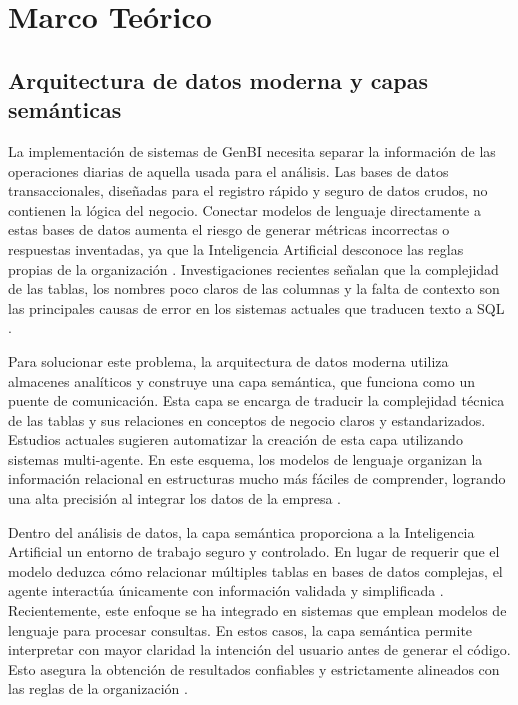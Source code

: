 \section{Marco Teórico}

\subsection{Arquitectura de datos moderna y capas semánticas}

La implementación de sistemas de GenBI
necesita separar la información de las operaciones diarias de aquella usada
para el análisis. Las bases de datos transaccionales, diseñadas para el
registro rápido y seguro de datos crudos, no contienen la lógica del negocio.
Conectar modelos de lenguaje directamente a estas bases de datos aumenta el
riesgo de generar métricas incorrectas o respuestas inventadas, ya que la
Inteligencia Artificial desconoce las reglas propias de la organización
\citep{negash2004fundamentos}. Investigaciones recientes señalan que la
complejidad de las tablas, los nombres poco claros de las columnas y la falta
de contexto son las principales causas de error en los sistemas actuales que
traducen texto a SQL \citep{rissaki2024agentic}.

Para solucionar este problema, la arquitectura de datos moderna utiliza
almacenes analíticos y construye una capa semántica, que funciona como un
puente de comunicación. Esta capa se encarga de traducir la complejidad
técnica de las tablas y sus relaciones en conceptos de negocio claros y
estandarizados. Estudios actuales sugieren automatizar la creación de esta
capa utilizando sistemas multi-agente. En este esquema, los modelos de
lenguaje organizan la información relacional en estructuras mucho más
fáciles de comprender, logrando una alta precisión al integrar los datos
de la empresa \citep{guerbas2025multiagent}.

Dentro del análisis de datos, la capa semántica proporciona a la Inteligencia
Artificial un entorno de trabajo seguro y controlado. En lugar de requerir que
el modelo deduzca cómo relacionar múltiples tablas en bases de datos complejas,
el agente interactúa únicamente con información validada y simplificada
\citep{rissaki2024agentic}. Recientemente, este enfoque se ha integrado en
sistemas que emplean modelos de lenguaje para procesar consultas. En estos
casos, la capa semántica permite interpretar con mayor claridad la intención
del usuario antes de generar el código. Esto asegura la obtención de
resultados confiables y estrictamente alineados con las reglas de la
organización \citep{tursio2026deepcontext}.

